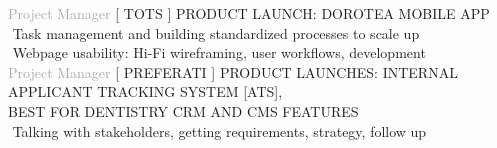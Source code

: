 \begin{cvtable}
{\textcolor{darkgray}{Project Manager}}%
{[ {T\scriptsize OTS} ]}%
{%
    {\scriptsize PRODUCT LAUNCH: DOROTEA MOBILE APP} \\
     \textperiodcentered $ $ Task management and building standardized processes to scale up \\
    \textperiodcentered $ $ Webpage usability: Hi-Fi wireframing, user workflows, development \\
}
% 
% 
{\textcolor{darkgray}{%
Project Manager}}%
{[ {P\scriptsize REFERATI} ]}%
{%
    {\scriptsize PRODUCT LAUNCHES:
    INTERNAL APPLICANT TRACKING SYSTEM [ATS], \\
    BEST FOR DENTISTRY CRM AND CMS FEATURES
    } \\
     \textperiodcentered $ $ Talking with stakeholders, %
     getting requirements, strategy, follow up \\  %
} 


\end{cvtable}

